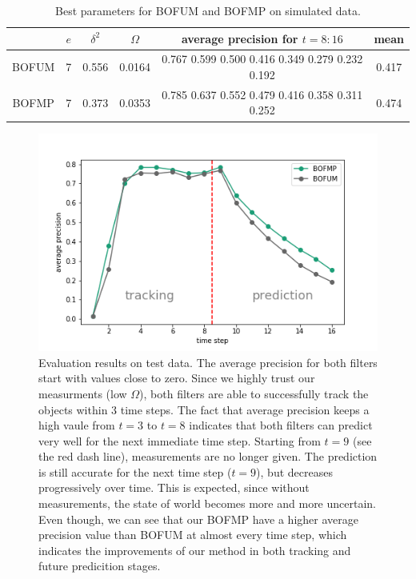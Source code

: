 \begin{table}[H]
\centering  
\begin{tabularx}{\textwidth}{c|c|c|c|c|c}
    \hline
    & $ e $ & $ \delta^2 $ & $ \Omega $ & average precision for $t=8:16 $ & mean\\ \hline
    BOFUM & 7 & 0.556 & 0.0164 &  0.767  0.599  0.500    0.416  0.349  0.279  0.232  0.192 & 0.417 \\
    BOFMP & 7 & 0.373 & 0.0353 & 0.785  0.637  0.552  0.479  0.416  0.358  0.311  0.252 & 0.474 \\
   \hline
  \end{tabularx}
\label{table:best_param_simulated}
\caption{Best parameters for BOFUM and BOFMP on simulated data.}
\end{table}


\begin{figure}[ht]
  \centering
    \includegraphics[width=.8\textwidth]{figures/test_on_simulated_data.png}
    \caption{Evaluation results on test data. The average precision for both filters start with values close to zero. Since we highly trust our measurments (low $\Omega$), both filters are able to successfully track the objects within 3 time steps. The fact that average precision keeps a high vaule from $t=3$ to $t=8$ indicates that both filters can predict very well for the next immediate time step. Starting from $t=9$ (see the red dash line), measurements are no longer given. The prediction is still accurate for the next time step ($t=9$), but decreases progressively over time.  This is expected, since without measurements, the state of world becomes more and more uncertain. Even though, we can see that our BOFMP have a higher average precision value than BOFUM at almost every time step, which indicates the improvements of our method in both tracking and future predicition stages.}
    \label{fig:simulated_test_data}
\end{figure}

